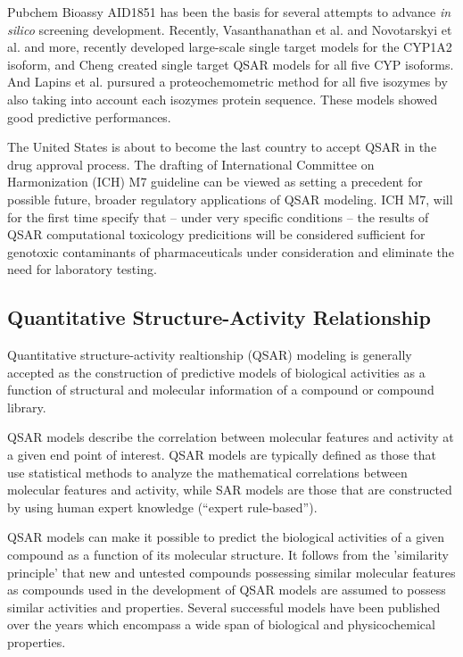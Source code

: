 Pubchem Bioassy AID1851 has been the basis for several attempts to advance \textit{in silico} screening development. Recently, Vasanthanathan et al. and Novotarskyi et al. and more, recently developed large-scale single target models for the CYP1A2 isoform, and Cheng created single target QSAR models for all five CYP isoforms.\cite{Vasanthanathan2012, Novotarskyi2012, Cheng2012} And Lapins et al. pursured a proteochemometric method for all five isozymes by also taking into account each isozymes protein sequence. \cite{Lapins2013} These models showed good predictive performances.


The United States is about to become the last country to accept QSAR in the drug approval process. The drafting of International Committee on Harmonization (ICH) M7 guideline can be viewed as setting a precedent for possible future, broader regulatory applications of QSAR modeling. ICH M7, will for the first time specify that -- under very specific conditions -- the results of QSAR computational toxicology predicitions will be considered sufficient for genotoxic contaminants of pharmaceuticals under consideration and eliminate the need for laboratory testing. \cite{Kruhlak2012}


\subsection{Quantitative Structure-Activity Relationship}

Quantitative structure-activity realtionship (QSAR) modeling is generally accepted as the construction of predictive models of biological activities as a function of structural and molecular information of a compound or compound library.\cite{Nantasenamat2009}

QSAR models describe the correlation between molecular features and activity at a given end point of interest. QSAR models are typically defined as those that use statistical methods to analyze the mathematical correlations between molecular features and activity, while SAR models are those that are constructed by using human expert knowledge (“expert rule-based”).

QSAR models can make it possible to predict the biological activities of a given compound as a function of its molecular structure. It follows from the 'similarity principle' that new and untested compounds possessing similar molecular features as compounds used in the development of QSAR models are assumed to possess similar activities and properties. Several successful models have been published over the years which encompass a wide span of biological and physicochemical properties.

